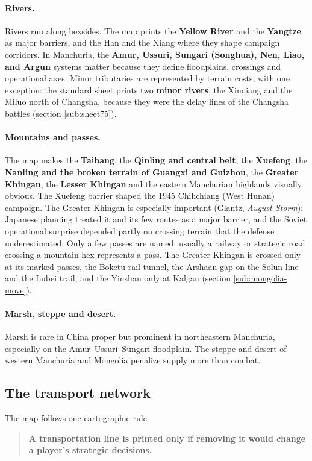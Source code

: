 \documentclass[11pt]{article}
\begin{document}
\paragraph{Rivers.} Rivers run along hexsides. The map prints the \textbf{Yellow River} and the \textbf{Yangtze} as major barriers, and the Han and the Xiang where they shape campaign corridors. In Manchuria, the \textbf{Amur, Ussuri, Sungari (Songhua), Nen, Liao, and Argun} systems matter because they define floodplains, crossings and operational axes. Minor tributaries are represented by terrain costs, with one exception: the standard sheet prints two \textbf{minor rivers}, the Xinqiang and the Miluo north of Changsha, because they were the delay lines of the Changsha battles (section \ref{sub:sheet75}).

\paragraph{Mountains and passes.} The map makes the \textbf{Taihang}, the \textbf{Qinling and central belt}, the \textbf{Xuefeng}, the \textbf{Nanling and the broken terrain of Guangxi and Guizhou}, the \textbf{Greater Khingan}, the \textbf{Lesser Khingan} and the eastern Manchurian highlands visually obvious. The Xuefeng barrier shaped the 1945 Chihchiang (West Hunan) campaign. The Greater Khingan is especially important (Glantz, \emph{August Storm}): Japanese planning treated it and its few routes as a major barrier, and the Soviet operational surprise depended partly on crossing terrain that the defense underestimated. Only a few passes are named; usually a railway or strategic road crossing a mountain hex represents a pass. The Greater Khingan is crossed only at its marked passes, the Boketu rail tunnel, the Arshaan gap on the Solun line and the Lubei trail, and the Yinshan only at Kalgan (section \ref{sub:mongolia-move}).

\paragraph{Marsh, steppe and desert.} Marsh is rare in China proper but prominent in northeastern Manchuria, especially on the Amur--Ussuri--Sungari floodplain. The steppe and desert of western Manchuria and Mongolia penalize supply more than combat.

\subsection{The transport network}\label{sub:network-map}
The map follows one cartographic rule:
\begin{quote}\textbf{A transportation line is printed only if removing it would change a player's strategic decisions.}\end{quote}
\end{document}
